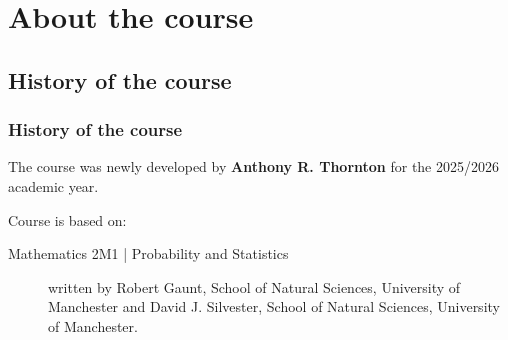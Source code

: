 \section{About the course}

\subsection{History of the course}
\begin{frame}
\frametitle{History of the course}
The course was \alert{newly} developed by \textbf{Anthony R. Thornton} for the 2025/2026 academic year.

Course is based on:
\begin{description}
\item[Mathematics 2M1 | Probability and Statistics] written by Robert Gaunt, School of Natural Sciences, University of Manchester
 and David J. Silvester, School of Natural Sciences, University of Manchester.
\end{description}

\end{frame}

